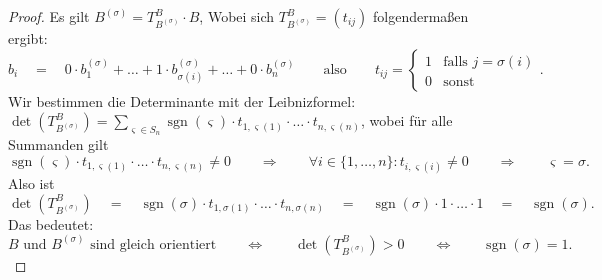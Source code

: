 \documentclass{article}
\newcommand{\imp}{\mathbb{\Rightarrow}}
\newcommand{\equ}{\mathbb{\Leftrightarrow}}
\newcommand{\eq}{\mathbb{\quad = \quad}}
\DeclareMathOperator{\sgn}{sgn}
\begin{document}
\begin{proof}
 Es gilt
 $B^{(\sigma)} = T^B_{B^{(\sigma)}} \cdot B$,
 Wobei sich
 $T^B_{B^{(\sigma)}} = (t_{ij})$
 folgendermaßen ergibt:
 \[
  b_i \eq 0 \cdot b^{(\sigma)}_1
  + \ldots + 1 \cdot b^{(\sigma)}_{\sigma(i)}
  + \ldots + 0 \cdot b^{(\sigma)}_n
  \qquad\text{also}\qquad
  t_{ij} = \begin{cases*}
    1 & \text{falls $j = \sigma(i)$} \\
    0 & \text{sonst}
   \end{cases*}.
 \]
Wir bestimmen die Determinante mit der Leibnizformel:
 $\det(T^B_{B^{(\sigma)}})
 =
 \sum_{\varsigma \in S_n} \sgn(\varsigma) \cdot t_{1,\varsigma(1)}
 \cdot \ldots \cdot t_{n,\varsigma(n)}
 $,
 wobei für alle Summanden gilt
 \[
  \sgn(\varsigma) \cdot t_{1,\varsigma(1)}
  \cdot \ldots \cdot t_{n,\varsigma(n)} \neq 0
 \qquad\imp\qquad
 \forall i \in \{1, \ldots, n\} : t_{i, \varsigma(i)} \neq 0
 \qquad\imp\qquad
 \varsigma = \sigma.
 \]
 Also ist
 \[
 \det(T^B_{B^{(\sigma)}})
 \eq
 \sgn(\sigma) \cdot t_{1,\sigma(1)}
 \cdot \ldots \cdot t_{n,\sigma(n)}
 \eq 
 \sgn(\sigma) \cdot 1
 \cdot \ldots \cdot 1
 \eq
 \sgn(\sigma).\]
 Das bedeutet:
 \[
 \text{$B$ und $B^{(\sigma)}$ sind gleich orientiert}
 \qquad\equ\qquad
 \det(T^B_{B^{(\sigma)}}) > 0
 \qquad\equ\qquad
 \sgn(\sigma) = 1.
 \]
\end{proof}
\end{document}
